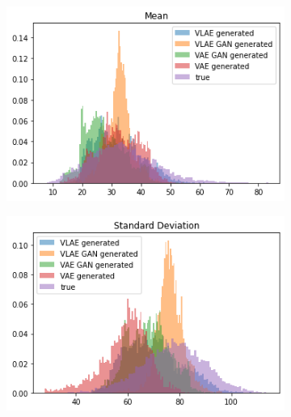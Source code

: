 \documentclass{beamer}
\begin{document}
\begin{frame}
\begin{figure}
\centering
\begin{subfigure}{0.48\textwidth}
\centering
\includegraphics[width=\textwidth]{images/generated_vs_true/mnist/mnist_vs_models_mean_gauss_post.png}
\end{subfigure}
\hfill
\begin{subfigure}{0.48\textwidth}
\centering
\includegraphics[width=\textwidth]{images/generated_vs_true/mnist/mnist_vs_models_sd_gauss_post.png}
\end{subfigure}
\hfill
\begin{subfigure}{0.48\textwidth}
\centering

\end{subfigure}
\end{figure}
\end{frame}
\end{document}
